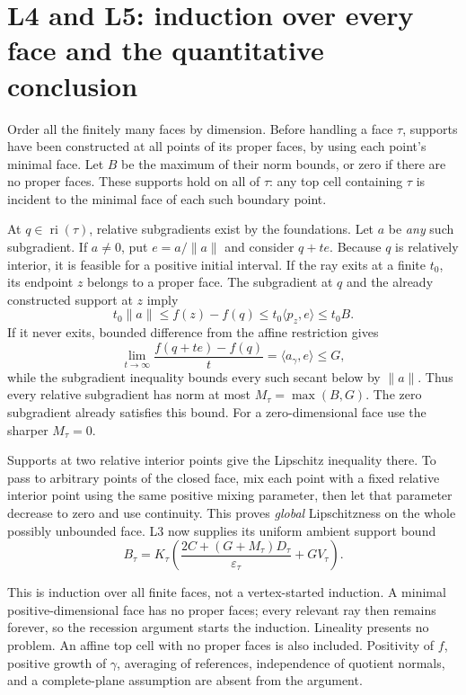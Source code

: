 \documentclass[
  11pt,
]{article}
\begin{document}
\section{L4 and L5: induction over every face and the quantitative
conclusion}\label{l4-and-l5-induction-over-every-face-and-the-quantitative-conclusion}

Order all the finitely many faces by dimension. Before handling a face
\(\tau\), supports have been constructed at all points of its proper
faces, by using each point's minimal face. Let \(B\) be the maximum of
their norm bounds, or zero if there are no proper faces. These supports
hold on all of \(\tau\): any top cell containing \(\tau\) is incident to
the minimal face of each such boundary point.

At \(q\in\operatorname{ri}(\tau)\), relative subgradients exist by the
foundations. Let \(a\) be \emph{any} such subgradient. If \(a\ne0\), put
\(e=a/\|a\|\) and consider \(q+t e\). Because \(q\) is relatively
interior, it is feasible for a positive initial interval. If the ray
exits at a finite \(t_0\), its endpoint \(z\) belongs to a proper face.
The subgradient at \(q\) and the already constructed support at \(z\)
imply \[
t_0\|a\|\leq f(z)-f(q)\leq t_0\langle p_z,e\rangle\leq t_0 B.
\] If it never exits, bounded difference from the affine restriction
gives \[
\lim_{t\to\infty}\frac{f(q+t e)-f(q)}t=\langle a_\gamma,e\rangle\leq G,
\] while the subgradient inequality bounds every such secant below by
\(\|a\|\). Thus every relative subgradient has norm at most
\(M_\tau=\max(B,G)\). The zero subgradient already satisfies this bound.
For a zero-dimensional face use the sharper \(M_\tau=0\).

Supports at two relative interior points give the Lipschitz inequality
there. To pass to arbitrary points of the closed face, mix each point
with a fixed relative interior point using the same positive mixing
parameter, then let that parameter decrease to zero and use continuity.
This proves \emph{global} Lipschitzness on the whole possibly unbounded
face. L3 now supplies its uniform ambient support bound
\[ B_\tau=K_\tau\left(\frac{2C+(G+M_\tau)D_\tau}{\varepsilon_\tau}+G V_\tau\right). \]

This is induction over all finite faces, not a vertex-started induction.
A minimal positive-dimensional face has no proper faces; every relevant
ray then remains forever, so the recession argument starts the
induction. Lineality presents no problem. An affine top cell with no
proper faces is also included. Positivity of \(f\), positive growth of
\(\gamma\), averaging of references, independence of quotient normals,
and a complete-plane assumption are absent from the argument.
\end{document}
